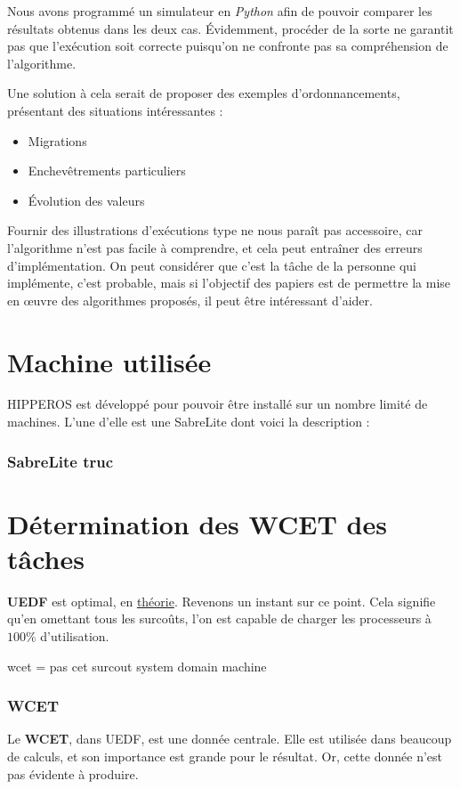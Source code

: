 	Nous avons programmé un simulateur en \textit{Python} afin de pouvoir comparer les résultats 
	obtenus dans les deux cas. Évidemment, procéder de la sorte ne garantit pas que l'exécution soit correcte
	puisqu'on ne confronte pas sa compréhension de l'algorithme. \newline
	
	Une solution à cela serait de proposer des exemples d'ordonnancements, présentant des situations intéressantes :
	\begin{itemize}
		\setlength\itemsep{0.1em}
		\item Migrations
		\item Enchevêtrements particuliers
		\item Évolution des valeurs
	\end{itemize}
	Fournir des illustrations d'exécutions type ne nous paraît pas accessoire, car l'algorithme n'est pas facile à comprendre, 
	et cela peut entraîner des erreurs d'implémentation. On peut considérer que c'est la tâche de la personne qui implémente, 
	c'est probable, mais si l'objectif des papiers est de permettre la mise en œuvre des algorithmes proposés, 
	il peut être intéressant d'aider. 
	

\section{Machine utilisée}
	HIPPEROS est développé pour pouvoir être installé sur un nombre limité de machines. 
	L'une d'elle est une SabreLite dont voici la description :
	
	\subsubsection{SabreLite truc}
	


\section{Détermination des WCET des tâches}
	\textbf{UEDF} est optimal, en \underline{théorie}. Revenons un instant sur ce point. 
	Cela signifie qu'en omettant tous les surcoûts, l'on est capable de charger les processeurs 
	à $100\%$ d'utilisation. 
	
	wcet = pas cet
	surcout
	system domain
	machine

		
\subsubsection{WCET}
Le \textbf{WCET}, dans UEDF, est une donnée centrale. Elle est utilisée dans beaucoup de calculs, et 
son importance est grande pour le résultat. Or, cette donnée n'est pas évidente à produire. \newline


